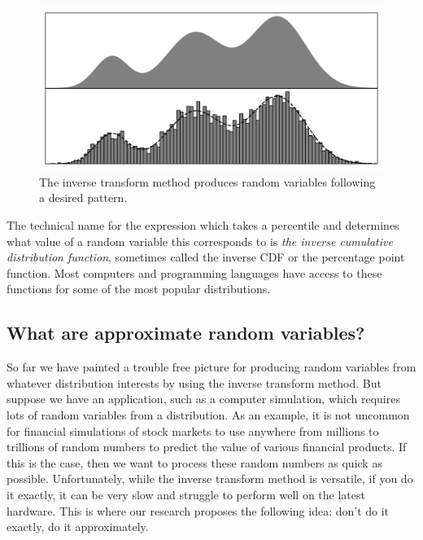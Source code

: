 \documentclass[11pt,a4paper,twoside,english]{extarticle}
\begin{document}
\begin{figure}[htb]
\centering
\includegraphics[width=0.7\linewidth, clip=true, trim={5mm, 2mm, 5mm, 5mm}]{inverse_cdf_transformation_method_schematic_simplified}
\caption[The inverse transform method]{The inverse transform method produces random variables following a desired pattern.}
\label{fig:inverse_cdf_transformation_method_schematic_simplified}
\end{figure}

The technical name for the expression which takes a percentile and determines what value of a random variable this corresponds to is \emph{the inverse cumulative distribution function}, sometimes called the inverse CDF or the percentage point function. Most computers and programming languages have access to these functions for some of the most popular distributions. 

\subsection{What are approximate random variables?}
\label{sec:what_are_approximate_random_variables}

So far we have painted a trouble free picture for producing random variables from whatever distribution interests by using the inverse transform method. But suppose we have an application, such as a computer simulation, which requires lots of random variables from a distribution. As an example, it is not uncommon for financial simulations of stock markets to use anywhere from millions to trillions of random numbers to predict the value of various financial products. If this is the case, then we want to process these random numbers as quick as possible. Unfortunately, while the inverse transform method is versatile, if you do it exactly, it can be very slow and struggle to perform well on the latest hardware. This is where our research proposes the following idea: don't do it exactly, do it approximately. 
\end{document}
